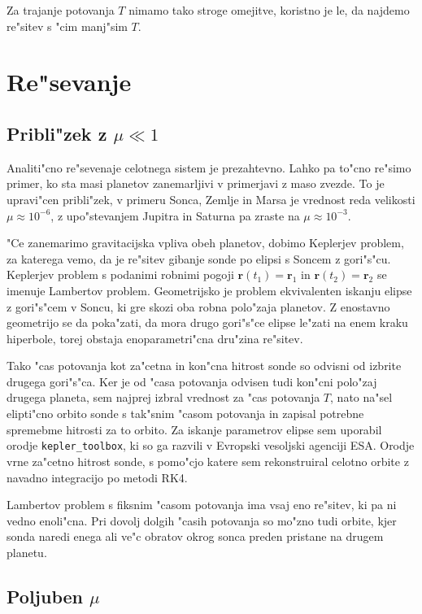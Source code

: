 \documentclass[a4paper,10pt]{article}
\renewcommand{\vec}{\mathbf}
\begin{document}
Za trajanje potovanja $T$ nimamo tako stroge omejitve, koristno je le, da najdemo re"sitev s "cim manj"sim $T$. 

\section{Re"sevanje}

\subsection{Pribli"zek z $\mu \ll 1$}
Analiti"cno re"sevenaje celotnega sistem je prezahtevno. Lahko pa to"cno re"simo primer, ko sta masi planetov zanemarljivi v primerjavi z maso zvezde. To je upravi"cen pribli"zek, v primeru Sonca, Zemlje in Marsa je vrednost reda velikosti $\mu \approx 10^{-6}$, z upo"stevanjem Jupitra in Saturna pa zraste na $\mu \approx 10^{-3}$. 

"Ce zanemarimo gravitacijska vpliva obeh planetov, dobimo Keplerjev problem, za katerega vemo, da je re"sitev gibanje sonde po elipsi s Soncem z gori"s"cu. Keplerjev problem s podanimi robnimi pogoji $\vec r(t_1) = \vec r_1$ in $\vec r(t_2) = \vec r_2$ se imenuje Lambertov problem\cite{wiki:lambert}. Geometrijsko je problem ekvivalenten iskanju elipse z gori"s"cem v Soncu, ki gre skozi oba robna polo"zaja planetov. Z enostavno geometrijo se da poka"zati, da mora drugo gori"s"ce elipse le"zati na enem kraku hiperbole, torej obstaja enoparametri"cna dru"zina re"sitev. 

Tako "cas potovanja kot za"cetna in kon"cna hitrost sonde so odvisni od izbrite drugega gori"s"ca. Ker je od "casa potovanja odvisen tudi kon"cni polo"zaj drugega planeta, sem najprej izbral vrednost za "cas potovanja $T$, nato na"sel elipti"cno orbito sonde s tak"snim "casom potovanja in zapisal potrebne spremebme hitrosti za to orbito. Za iskanje parametrov elipse sem uporabil orodje \texttt{kepler\_toolbox}, ki so ga razvili v Evropski vesoljski agenciji ESA. Orodje vrne za"cetno hitrost sonde, s pomo"cjo katere sem rekonstruiral celotno orbite z navadno integracijo po metodi RK4. 

Lambertov problem s fiksnim "casom potovanja ima vsaj eno re"sitev, ki pa ni vedno enoli"cna. Pri dovolj dolgih "casih potovanja so mo"zno tudi orbite, kjer sonda naredi enega ali ve"c obratov okrog sonca preden pristane na drugem planetu. 

\subsection{Poljuben $\mu$}
\end{document}
